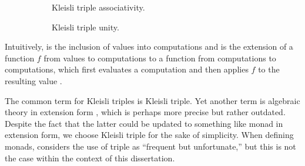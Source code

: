 \begin{definition}
\begin{figure}[htb]
\begin{subfigure}[b]{0.5\linewidth}
\begin{center}
      \end{center}
      \caption{Kleisli triple associativity.}
      \label{fig:triple-associativity}
    \end{subfigure}
    \begin{subfigure}[b]{0.5\linewidth}
      \begin{center}
      \end{center}
      \caption{Kleisli triple unity.}
      \label{fig:triple-unity}
    \end{subfigure}
    \caption{}
  \end{figure}
\end{definition}

\begin{remark}
  \label{re:triple}

  Intuitively,  is the inclusion of values into
  computations and  is the extension of a function $f$ from
  values to computations to a function from computations to
  computations, which first evaluates a computation and then applies
  $f$ to the resulting value \parencite[59]{moggi-1991}.

\end{remark}

\begin{terminology}
  \label{ter:triple}

  The common term for Kleisli triples is Kleisli triple. Yet
  another term is algebraic theory in extension form
  \parencite[32]{manes-1976}, which is perhaps more precise but rather
  outdated. Despite the fact that the latter could be updated to
  something like monad in extension form, we choose
  Kleisli triple for the sake of simplicity. When defining
  monads, \textcite[138]{maclane-1998} considers the use of
  triple as ``frequent but unfortunate,'' but this is not the
  case within the context of this dissertation. 

\end{terminology}


